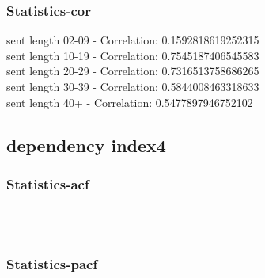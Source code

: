 \documentclass{article}%
\begin{document}
%
\newpage%
\subsubsection{Statistics{-}cor}%
\label{ssubsec:Statistics{-}cor}%
\noindent%
sent length 02-09 - Correlation: 0.1592818619252315\\%
sent length 10-19 - Correlation: 0.7545187406545583\\%
sent length 20-29 - Correlation: 0.7316513758686265\\%
sent length 30-39 - Correlation: 0.5844008463318633\\%
sent length 40+ - Correlation: 0.5477897946752102\\

%
\newpage

%
\subsection{dependency index4}%
\label{subsec:dependencyindex4}%
\subsubsection{Statistics{-}acf}%
\label{ssubsec:Statistics{-}acf}%


\begin{figure}[ht]%
\centering%
\setlength{\abovecaptionskip}{-35pt}%
%
%
\\%
%
%
\\%
%
\end{figure}

%
\newpage%
\subsubsection{Statistics{-}pacf}%
\label{ssubsec:Statistics{-}pacf}%
\end{document}
